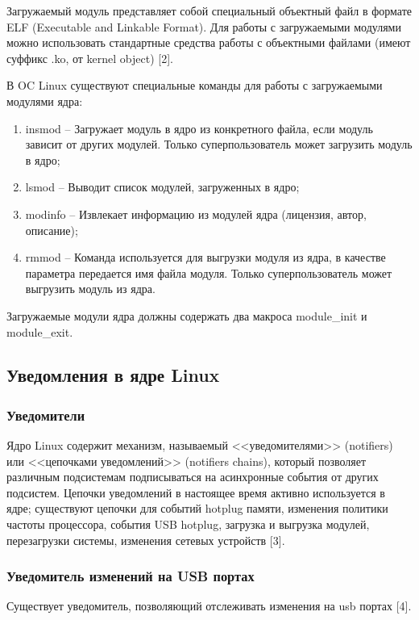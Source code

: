 \documentclass[a4paper, 10pt]{article}
\begin{document}
	Загружаемый модуль представляет собой специальный объектный файл в формате ELF (Executable and Linkable Format). Для работы с загружаемыми модулями можно использовать стандартные средства работы с объектными файлами (имеют суффикс .ko, от kernel object) [2].
	
	
	В OC Linux существуют специальные команды для работы с загружаемыми модулями ядра:
	\begin{enumerate}
		\item insmod -- Загружает модуль в ядро из конкретного файла, если модуль зависит от других модулей. Только суперпользователь может загрузить модуль в ядро;
		\item lsmod -- Выводит список модулей, загруженных в ядро;
		\item modinfo -- Извлекает информацию из модулей ядра (лицензия, автор, описание);
		\item rmmod -- Команда используется для выгрузки модуля из ядра, в качестве параметра передается имя файла модуля. Только суперпользователь может выгрузить модуль из ядра.
	\end{enumerate}
	
	Загружаемые модули ядра должны содержать два макроса module\_init и module\_exit.
	
	\subsection{Уведомления в ядре Linux}
	\subsubsection{Уведомители}
	\hspace*{5mm} Ядро Linux содержит механизм, называемый <<уведомителями>> (notifiers) или <<цепочками уведомлений>> (notifiers chains), который позволяет различным подсистемам подписываться на асинхронные события от других подсистем. Цепочки уведомлений в настоящее время активно используется в ядре; существуют цепочки для событий hotplug памяти, изменения политики частоты процессора, события USB hotplug, загрузка и выгрузка модулей, перезагрузки системы, изменения сетевых устройств [3].
	
	\subsubsection{Уведомитель изменений на USB портах}
	Существует уведомитель, позволяющий отслеживать изменения на usb портах [4].
	
\end{document}
